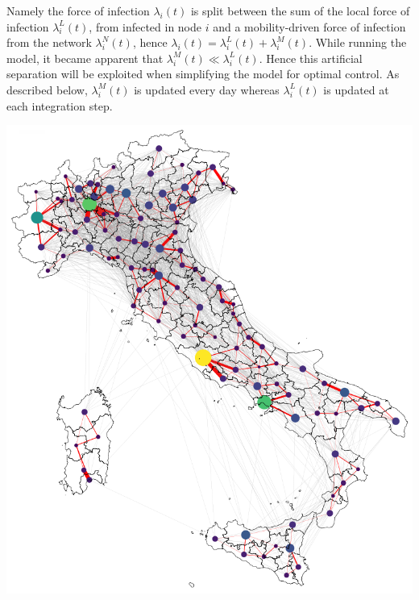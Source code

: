 Namely the force of infection $\lambda_i(t)$ is split between the sum of the local force of infection $\lambda^L_i(t)$, from infected in node $i$ and a mobility-driven force of infection from the network $\lambda^N_i(t)$, hence $\lambda_i(t) = \lambda^L_i(t) + \lambda^M_i(t)$. While running the model, it became apparent that $\lambda^M_i(t) \ll \lambda^L_i(t)$. Hence this artificial separation will be exploited when simplifying the model for optimal control. As described below, $\lambda^M_i(t)$ is updated every day whereas $\lambda^L_i(t)$ is updated at each integration step.
\begin{marginfigure}
\centering
\includegraphics{fig_italy-ocp/figures/map_nd.png}
    \label{fig:model_description_network}
\end{marginfigure}

